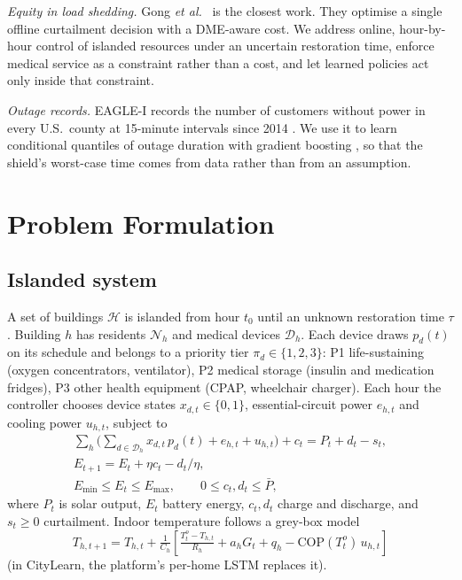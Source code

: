 \documentclass[conference]{IEEEtran}
\begin{document}
\textit{Equity in load shedding.} Gong \textit{et al.}\ \cite{gong2026dilemma} is the closest work. They optimise a single offline curtailment decision with a DME-aware cost. We address online, hour-by-hour control of islanded resources under an uncertain restoration time, enforce medical service as a constraint rather than a cost, and let learned policies act only inside that constraint.

\textit{Outage records.} EAGLE-I records the number of customers without power in every U.S.\ county at 15-minute intervals since 2014 \cite{brelsford2024eaglei}. We use it to learn conditional quantiles of outage duration \cite{koenker1978quantile} with gradient boosting \cite{friedman2001gbm}, so that the shield's worst-case time comes from data rather than from an assumption.

\section{Problem Formulation}
\subsection{Islanded system}
A set of buildings $\mathcal{H}$ is islanded from hour $t_0$ until an unknown restoration time $\tau$. Building $h$ has residents $\mathcal{N}_h$ and medical devices $\mathcal{D}_h$. Each device draws $p_d(t)$ on its schedule and belongs to a priority tier $\pi_d\in\{1,2,3\}$: P1 life-sustaining (oxygen concentrators, ventilator), P2 medical storage (insulin and medication fridges), P3 other health equipment (CPAP, wheelchair charger). Each hour the controller chooses device states $x_{d,t}\in\{0,1\}$, essential-circuit power $e_{h,t}$ and cooling power $u_{h,t}$, subject to
\begin{gather}
\textstyle\sum_{h}\big(\sum_{d\in\mathcal{D}_h} x_{d,t}\,p_d(t) + e_{h,t} + u_{h,t}\big) + c_t = P_t + d_t - s_t, \\
E_{t+1} = E_t + \eta c_t - d_t/\eta, \\
E_{\min}\le E_t\le E_{\max},\qquad 0\le c_t,d_t\le \bar P,
\end{gather}
where $P_t$ is solar output, $E_t$ battery energy, $c_t,d_t$ charge and discharge, and $s_t\ge 0$ curtailment. Indoor temperature follows a grey-box model
\begin{equation}
T_{h,t+1} = T_{h,t} + \tfrac{1}{C_h}\!\left[\tfrac{T^{o}_t - T_{h,t}}{R_h} + a_h G_t + q_h - \mathrm{COP}(T^{o}_t)\,u_{h,t}\right]
\end{equation}
(in CityLearn, the platform's per-home LSTM replaces it).
\end{document}
